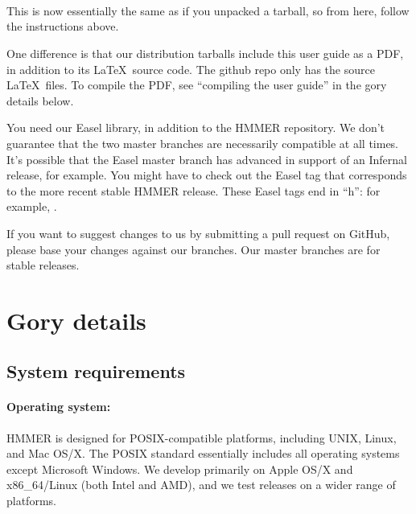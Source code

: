   \vspace{1ex}
   \\
   \\
   \\
  \vspace{1ex}

This is now essentially the same as if you unpacked a tarball, so from
here, follow the  instructions above.

One difference is that our distribution tarballs include this user
guide as a PDF, in addition to its \LaTeX\ source code. The github
repo only has the source \LaTeX\ files. To compile the PDF, see
``compiling the user guide'' in the gory details below.

You need our Easel library, in addition to the HMMER repository. We
don't guarantee that the two master branches are necessarily
compatible at all times. It's possible that the Easel master branch
has advanced in support of an Infernal release, for example. You might
have to check out the Easel tag that corresponds to the more recent
stable HMMER release. These Easel tags end in ``h'': for example,
.

If you want to suggest changes to us by submitting a pull request on
GitHub, please base your changes against our  branches.
Our master branches are for stable releases.



\section{Gory details}

\subsection{System requirements}

\paragraph{Operating system:} HMMER is designed for
POSIX-compatible platforms, including UNIX, Linux, and Mac OS/X. The
POSIX standard essentially includes all operating systems except
Microsoft Windows.  We develop primarily on Apple OS/X and
x86\_64/Linux (both Intel and AMD), and we test releases on a wider
range of platforms.
  


